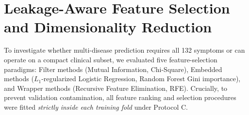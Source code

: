 \section{Leakage-Aware Feature Selection and Dimensionality Reduction}
\label{sec:feature_selection}

To investigate whether multi-disease prediction requires all 132 symptoms or can operate on a compact clinical subset, we evaluated five feature-selection paradigms: Filter methods (Mutual Information, Chi-Square), Embedded methods ($L_1$-regularized Logistic Regression, Random Forest Gini importance), and Wrapper methods (Recursive Feature Elimination, RFE). Crucially, to prevent validation contamination, all feature ranking and selection procedures were fitted \emph{strictly inside each training fold} under Protocol C.

